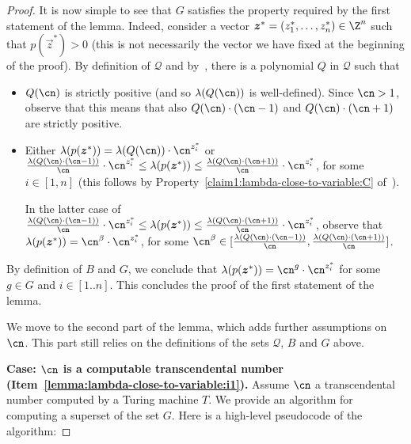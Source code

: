 \begin{proof}
    It is now simple to see that $G$ satisfies the property required by the first statement of the lemma. 
    Indeed, consider a vector $\vec z^* = (z_1^*,\dots,z_n^*) \in \Z^n$ such that $p(\vec z^*) > 0$ (this is not necessarily the vector we have fixed at the beginning of the proof). 
    By definition of $\mathcal{Q}$ and by~,
    there is a polynomial $Q$ in $\mathcal{Q}$ such that 
    \begin{itemize} 
        \item $Q(\cn)$ is strictly positive (and so $\lambda(Q(\cn))$ is well-defined). Since $\cn > 1$, observe that this means that also $Q(\cn) \cdot (\cn-1)$ and $Q(\cn) \cdot (\cn+1)$ are strictly positive.
        \item Either $\lambda(p(\vec z^*)) = \lambda(Q(\cn)) \cdot \cn^{z_i^*}$ or $\frac{\lambda(Q(\cn) \cdot (\cn-1))}{\cn} \cdot \cn^{z_i^*} \leq \lambda(p(\vec z^*)) \leq \frac{\lambda(Q(\cn) \cdot (\cn+1))}{\cn} \cdot \cn^{z_i^*}$, for some $i \in [1,n]$ (this follows by Property~\ref{claim1:lambda-close-to-variable:C} of~). 

        In the latter case of $\frac{\lambda(Q(\cn) \cdot (\cn-1))}{\cn} \cdot \cn^{z_i^*} \leq \lambda(p(\vec z^*)) \leq \frac{\lambda(Q(\cn) \cdot (\cn+1))}{\cn} \cdot \cn^{z_i^*}$, observe that $\lambda(p(\vec z^*)) = \cn^\beta \cdot \cn^{z_i^*}$, for some $\cn^\beta \in [\frac{\lambda(Q(\cn) \cdot (\cn-1))}{\cn},\frac{\lambda(Q(\cn) \cdot (\cn+1))}{\cn}]$.
    \end{itemize}
    By definition of $B$ and $G$, 
    we conclude that $\lambda(p(\vec z^*)) = \cn^g \cdot \cn^{z_i^*}$ 
    for some $g \in G$ and $i \in [1..n]$. 
    This concludes the proof of the first statement of the lemma.
  
    We move to the second part of the lemma, which adds further assumptions
    on~$\cn$. This part still relies on the definitions of the sets $\mathcal{Q}$, $B$ and $G$ above.
  
    \noindent
    \textbf{Case: $\cn$ is a computable transcendental number (Item~\eqref{lemma:lambda-close-to-variable:i1}).}
    Assume $\cn$ a transcendental number computed by a Turing machine $T$. We provide an algorithm for computing a superset of the set $G$. Here is a high-level pseudocode of the algorithm:


\end{proof}

